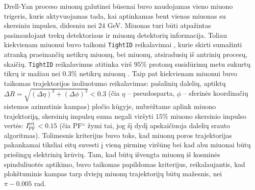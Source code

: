 \documentclass[a4paper, 12pt, oneside]{article}
\newcommand{\ttt}[1]{\texttt{#1}}
\newcommand{\ltq}[1]{{\quotedblbase{}#1\textquotedblleft{}}}
\newlength\q
\begin{document}
Drell-Yan proceso miuonų galutinei būsenai buvo naudojamas vieno miuono trigeris, kuris aktyvuojamas tada,
kai aptinkamas bent vienas miuonas su skersiniu impulsu, didesniu nei $24$ GeV.
Miuonas turi būti atpažintas pasinaudojant trekų detektoriaus ir miuonų detektorių informacija.
Toliau kiekvienam miuonui buvo taikomi \ttt{TightID} reikalavimai \cite{MuonID}, kurie skirti sumažinti atranką
praeinančių netikrų miuonų, bei miuonų, atsiradusių iš antrinių procesų, skaičių.
\ttt{TightID} reikalavimus atitinka virš $95\%$ protonų susidūrimų metu sukurtų tikrų ir mažiau nei $0.3\%$ netikrų
miuonų \cite{MuonID}.
Taip pat kiekvienam miuonui buvo taikomas trajektorijos izoliuotumo reikalavimas: pašalinių dalelių, aptiktų
$\Delta R = \sqrt{(\Delta\eta)^2 + (\Delta\phi)^2} < 0.3$ (čia $\eta$ -- pseudosparta, $\phi$ -- sferinės koordinačių
sistemos azimutinis kampas) pločio kūgyje, nubrėžtame aplink miuono trajektoriją, skersinių impulsų suma negali
viršyti $15\%$ miuono skersinio impulso vertės: $I_{\mathrm{PF}}^{\mathrm{rel.}}<0.15$ (čia \ltq{PF} žymi tai, jog
šį dydį apskaičiuoja dalelių srauto algoritmas).
Tolimesnis kriterijus buvo toks, kad miuonų poros trajektorijas pakankamai tiksliai eitų suvesti į vieną pirminę
viršūnę bei kad abu miuonai būtų priešingų elektrinių krūvių.
Tam, kad būtų išvengta miuonų iš kosminės spinduliuotės aptikimo, buvo taikomas papildomas kriterijus, reikalaujantis,
kad plokštuminis kampas tarp dviejų miuonų trajektorijų būtų mažesnis, nei $\pi-0.005$ rad.
\end{document}
